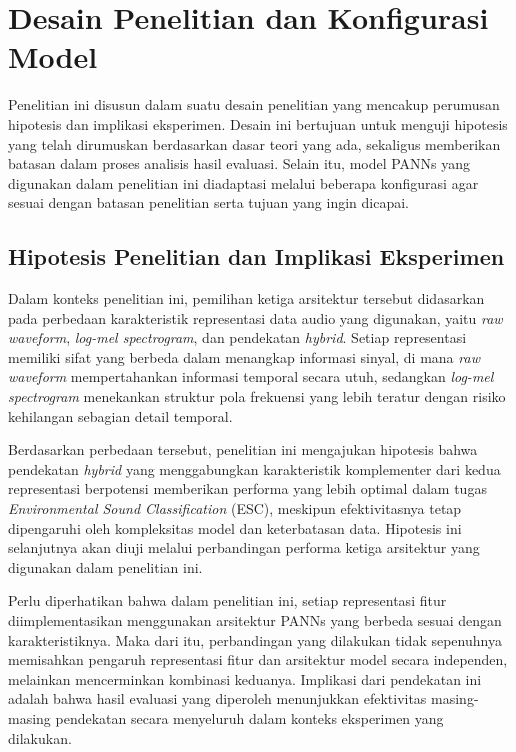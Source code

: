 \section{Desain Penelitian dan Konfigurasi Model} \label{sec:desain_dan_konfigurasi_model}
Penelitian ini disusun dalam suatu desain penelitian yang mencakup perumusan hipotesis dan implikasi eksperimen.
Desain ini bertujuan untuk menguji hipotesis yang telah dirumuskan berdasarkan dasar teori yang ada, sekaligus memberikan batasan dalam proses analisis hasil evaluasi.
Selain itu, model PANNs yang digunakan dalam penelitian ini diadaptasi melalui beberapa konfigurasi agar sesuai dengan batasan penelitian serta tujuan yang ingin dicapai. \par

\subsection{Hipotesis Penelitian dan Implikasi Eksperimen}
Dalam konteks penelitian ini, pemilihan ketiga arsitektur tersebut didasarkan pada perbedaan karakteristik representasi data audio yang digunakan, yaitu \textit{raw waveform}, \textit{log-mel spectrogram}, dan pendekatan \textit{hybrid}.
Setiap representasi memiliki sifat yang berbeda dalam menangkap informasi sinyal, di mana \textit{raw waveform} mempertahankan informasi temporal secara utuh, sedangkan \textit{log-mel spectrogram} menekankan struktur pola frekuensi yang lebih teratur dengan risiko kehilangan sebagian detail temporal. \par

Berdasarkan perbedaan tersebut, penelitian ini mengajukan hipotesis bahwa pendekatan \textit{hybrid} yang menggabungkan karakteristik komplementer dari kedua representasi berpotensi memberikan performa yang lebih optimal dalam tugas \textit{Environmental Sound Classification} (ESC), meskipun efektivitasnya tetap dipengaruhi oleh kompleksitas model dan keterbatasan data.
Hipotesis ini selanjutnya akan diuji melalui perbandingan performa ketiga arsitektur yang digunakan dalam penelitian ini. \par

Perlu diperhatikan bahwa dalam penelitian ini, setiap representasi fitur diimplementasikan menggunakan arsitektur PANNs yang berbeda sesuai dengan karakteristiknya.
Maka dari itu, perbandingan yang dilakukan tidak sepenuhnya memisahkan pengaruh representasi fitur dan arsitektur model secara independen, melainkan mencerminkan kombinasi keduanya. 
Implikasi dari pendekatan ini adalah bahwa hasil evaluasi yang diperoleh menunjukkan efektivitas masing-masing pendekatan secara menyeluruh dalam konteks eksperimen yang dilakukan. \par

